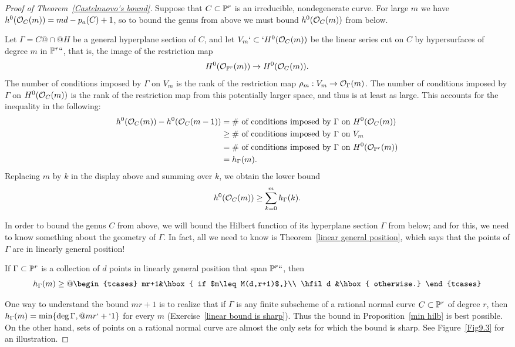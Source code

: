 \begin{proof}[Proof of Theorem~\ref{Castelnuovo's bound}]
Suppose that $C \subset {\mathbb P}^r$ is an irreducible, nondegenerate curve. For
large $m$ we have
$h^{0}({\mathcal O}_{C}(m)) = md-p_{a}(C) +1$, so to bound the genus from above
we must
bound $h^{0}({\mathcal O}_{C}(m))$ from below.

Let $\Gamma = C@\cap@H$ be a general hyperplane section of $C$, and
let $V_m`\subset`H^0({\mathcal O}_C(m))$ be the linear series cut on $C$ by
hypersurfaces of degree $m$ in ${\mathbb P}^r` `$, that is, the image of the
restriction map
$$
H^0({\mathcal O}_{{\mathbb P}^r}(m)) \to H^0({\mathcal O}_C(m)).
$$
The number of  conditions imposed by $\Gamma$ on $V_m$ is the rank of
the restriction map
$\rho_m: V_m \to {\mathcal O}_\Gamma(m)$.
 The number of conditions imposed by $\Gamma$ on $H^{0}({\mathcal O}_{C}(m))$
 is the
 rank of the restriction map from this potentially larger space, and
 thus is at least as large. This
 accounts for the inequality in the following:
{\advance\jot-2pt
\begin{align*}
h^0({\mathcal O}_C(m)) - h^0({\mathcal O}_C(m-1)) & = \text{\# of conditions imposed by
$\Gamma$ on $H^0({\mathcal O}_C(m))$}\\
&\geq \text{\# of conditions imposed by $\Gamma$ on $V_m$} \\
&= \text{\# of conditions imposed by $\Gamma$ on $H^0({\mathcal O}_{{\mathbb P}^r}(m))$} \\
&= h_\Gamma(m).
\end{align*}}%
Replacing $m$ by $k$ in the display above and summing
over $k$, we obtain the lower bound
$$
h^0({\mathcal O}_C(m)) \geq \sum_{k=0}^m h_\Gamma(k).
$$

In order to bound the genus $C$ from above, we will bound the Hilbert
function of its hyperplane section $\Gamma$  from below; and for this,
we need to know something about the geometry of $\Gamma$. In fact, all
we need to know is Theorem~\ref{linear general position}, which says
that the points of $\Gamma$ are in
linearly general position!
%

\begin{proposition}\label{min hilb}
If $\Gamma \subset {\mathbb P}^r$ is a collection of $d$ points in linearly
general position that span ${\mathbb P}^r` `$, then
$$
h_\Gamma(m) \geq
@
\begin{tcases}
mr+1&\hbox{ if $m\leq M(d,r+1)$,}\\
\hfil d &\hbox{ otherwise.}
\end{tcases}
$$
\end{proposition}

One way to understand the bound $mr+1$ is to realize that if $\Gamma$
is any finite subscheme of a rational normal curve $C\subset{\mathbb P}^r$
of degree $r$,
then $h_\Gamma(m) = \min\{\deg \Gamma,@ mr`+`1\}$ for every $m$
(Exercise~\ref{linear bound is sharp}).
  Thus the bound in Proposition~\ref{min hilb} is best possible.
On the other hand, sets of points on a rational normal curve are almost
the only sets for which the bound is sharp. See Figure~\ref{Fig9.3}
for an illustration.


\end{proof}
